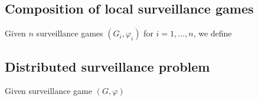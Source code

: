 \subsection{Composition of local surveillance games}
Given $n$ surveillance games $(G_i,\varphi_i)$ for $i = 1,\dots,n$, we define 


\subsection{Distributed surveillance problem}



Given surveillance game  $(G,\varphi)$